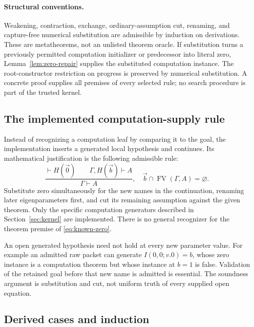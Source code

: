 \documentclass[11pt,letterpaper]{article}
\theoremstyle{definition}\newtheorem{definition}[theorem]{Definition}
\theoremstyle{remark}\newtheorem{remark}[theorem]{Remark}
\newcommand{\FV}{\operatorname{FV}}
\begin{document}
\paragraph{Structural conventions.}
Weakening, contraction, exchange, ordinary-assumption cut, renaming, and
capture-free numerical substitution are admissible by induction on
derivations. These are metatheorems, not an unlisted theorem oracle.
If substitution turns a previously permitted computation initializer or
predecessor into literal zero, Lemma~\ref{lem:zero-repair} supplies the
substituted computation instance.
The root-constructor restriction on progress is preserved by numerical
substitution. A concrete proof supplies all premises of every selected
rule; no search procedure is part of the trusted kernel.

\subsection{The implemented computation-supply rule}

Instead of recognizing a computation leaf by comparing it to the goal,
the implementation inserts a generated local hypothesis and continues.
Its mathematical justification is the following admissible rule:
\begin{equation}
 \frac{\vdash H(\vec0)\qquad\Gamma,H(\vec b)\vdash A}
      {\Gamma\vdash A},
 \quad \vec b\cap\FV(\Gamma,A)=\varnothing.
 \label{eq:known-zero}
\end{equation}
Substitute zero simultaneously for the new names in the continuation,
renaming later eigenparameters first, and cut its remaining assumption
against the given theorem. Only the specific computation generators
described in Section~\ref{sec:kernel} are implemented. There is no general
recognizer for the theorem premise of \eqref{eq:known-zero}.

An open generated hypothesis need not hold at every new parameter value.
For example an admitted raw packet can generate
$I(0,0;v.0)=b$, whose zero instance is a computation theorem but whose
instance at $b=1$ is false. Validation of the retained goal before that
new name is admitted is essential. The soundness argument is substitution
and cut, not uniform truth of every supplied open equation.

\subsection{Derived cases and induction}
\end{document}
